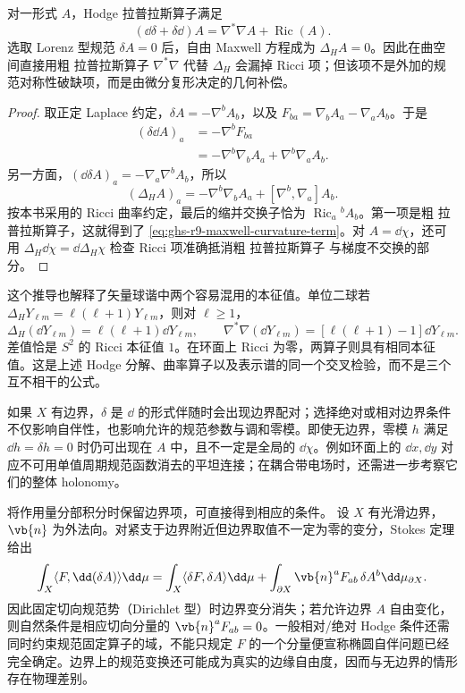 \begin{proposition}
\label{prop:ghs-r9-maxwell-weitzenbock}
对一形式 $A$，Hodge 拉普拉斯算子满足
\begin{equation}\label{eq:ghs-r9-maxwell-curvature-term}
 (\dd\delta+\delta\dd)A
 =\nabla^*\nabla A+\operatorname{Ric}(A).
\end{equation}
选取 Lorenz 型规范 $\delta A=0$ 后，自由 Maxwell 方程成为 $\Delta_HA=0$。因此在曲空间直接用粗 拉普拉斯算子 $\nabla^*\nabla$ 代替 $\Delta_H$ 会漏掉 Ricci 项；但该项不是外加的规范对称性破缺项，而是由微分复形决定的几何补偿。
\end{proposition}
\begin{proof}
取正定 Laplace 约定，$\delta A=-\nabla^bA_b$，以及 $F_{ba}=\nabla_bA_a-\nabla_aA_b$。于是
\begin{align*}
 (\delta\dd A)_a
 &=-\nabla^bF_{ba}\\
 &=-\nabla^b\nabla_bA_a+\nabla^b\nabla_aA_b.
\end{align*}
另一方面，$(\dd\delta A)_a=-\nabla_a\nabla^bA_b$，所以
\[
 (\Delta_HA)_a=-\nabla^b\nabla_bA_a
 +[\nabla^b,\nabla_a]A_b.
\]
按本书采用的 Ricci 曲率约定，最后的缩并交换子恰为 $\operatorname{Ric}_a{}^bA_b$。第一项是粗 拉普拉斯算子，这就得到了 \cref{eq:ghs-r9-maxwell-curvature-term}。对 $A=\dd\chi$，还可用 $\Delta_H\dd\chi=\dd\Delta_H\chi$ 检查 Ricci 项准确抵消粗 拉普拉斯算子 与梯度不交换的部分。
\end{proof}

这个推导也解释了矢量球谐中两个容易混用的本征值。单位二球若 $\Delta_HY_{\ell m}=\ell(\ell+1)Y_{\ell m}$，则对 $\ell\ge1$，
\[
 \Delta_H(\dd Y_{\ell m})=\ell(\ell+1)\dd Y_{\ell m},\qquad
 \nabla^*\nabla(\dd Y_{\ell m})=[\ell(\ell+1)-1]\dd Y_{\ell m}.
\]
差值恰是 $S^2$ 的 Ricci 本征值 $1$。在环面上 Ricci 为零，两算子则具有相同本征值。这是上述 Hodge 分解、曲率算子以及表示谱的同一个交叉检验，而不是三个互不相干的公式。

如果 $X$ 有边界，$\delta$ 是 $\dd$ 的形式伴随时会出现边界配对；选择绝对或相对边界条件不仅影响自伴性，也影响允许的规范参数与调和零模。即使无边界，零模 $h$ 满足 $\dd h=\delta h=0$ 时仍可出现在 $A$ 中，且不一定是全局的 $\dd\chi$。例如环面上的 $\dd x,\dd y$ 对应不可用单值周期规范函数消去的平坦连接；在耦合带电场时，还需进一步考察它们的整体 holonomy。

将作用量分部积分时保留边界项，可直接得到相应的条件。
设 $X$ 有光滑边界，$\vb{n}$ 为外法向。对紧支于边界附近但边界取值不一定为零的变分，Stokes 定理给出
\[
 \int_X\langle F,\dd(\delta A)\rangle\dd\mu
 =\int_X\langle\delta F,\delta A\rangle\dd\mu
 +\int_{\partial X}\vb{n}^aF_{ab}\,\delta A^b\dd\mu_{\partial X}.
\]
因此固定切向规范势（Dirichlet 型）时边界变分消失；若允许边界 $A$ 自由变化，则自然条件是相应切向分量的 $\vb{n}^aF_{ab}=0$。一般相对/绝对 Hodge 条件还需同时约束规范固定算子的域，不能只规定 $F$ 的一个分量便宣称椭圆自伴问题已经完全确定。边界上的规范变换还可能成为真实的边缘自由度，因而与无边界的情形存在物理差别。
